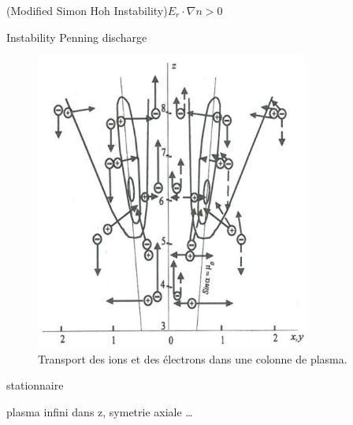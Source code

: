 \begin{refsection}
\parencite{Sakawa} (Modified Simon Hoh Instability)$E_r\cdot\nabla n > 0$

\parencite{Hoh} Instability Penning discharge

\begin{figure}[htbp]
\centering
\includegraphics[width=0.8\textwidth]{figures/4-magnetizedColumn.jpg}
{\caption{Transport des ions et des électrons dans une colonne de
plasma\parencite{Rozhansky}.}
\label{1-magnetizedColumn}}
\end{figure}


\parencite{Fruchtman} stationnaire

\parencite{Sternberg} plasma infini dans z, symetrie axiale \ldots 
%
%
\end{refsection}

